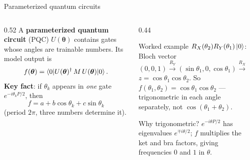 \documentclass[aspectratio=169,11pt]{beamer}
\newcommand{\key}[1]{{\color{qdark}\textbf{#1}}}
\newcommand{\btheta}{\boldsymbol\theta}
\begin{document}
\begin{frame}[label=fPQC]{Parameterized quantum circuits}
  \begin{columns}[T]
    \begin{column}{0.52\textwidth}
      \small
      A \key{parameterized quantum circuit} (PQC) $U(\btheta)$ contains gates whose angles are trainable numbers. Its model output is
      \[ f(\btheta) = \braket{0|U(\btheta)^\dagger\,M\,U(\btheta)|0}. \]
      \key{Key fact}: if $\theta_k$ appears in \emph{one} gate $e^{-i\theta_kP/2}$, then
      \[ f = a + b\cos\theta_k + c\sin\theta_k \]
      (period $2\pi$, three numbers determine it).
    \end{column}
    \begin{column}{0.44\textwidth}
      \begin{exampleblock}{Worked example}
        \scriptsize $R_X(\theta_2)R_Y(\theta_1)\ket0$: Bloch vector $(0,0,1) \xrightarrow{R_Y} (\sin\theta_1, 0, \cos\theta_1) \xrightarrow{R_X}$\\
        $z = \cos\theta_1\cos\theta_2$. So $f(\theta_1, \theta_2) = \cos\theta_1\cos\theta_2$ --- trigonometric in each angle separately,
        not $\cos(\theta_1 + \theta_2)$.
      \end{exampleblock}
      \begin{block}{Why trigonometric?}
        \scriptsize $e^{-i\theta P/2}$ has eigenvalues $e^{\mp i\theta/2}$; $f$ multiplies the ket and bra factors, giving frequencies $0$ and $1$ in $\theta$.
      \end{block}
    \end{column}
  \end{columns}
\end{frame}
\end{document}
